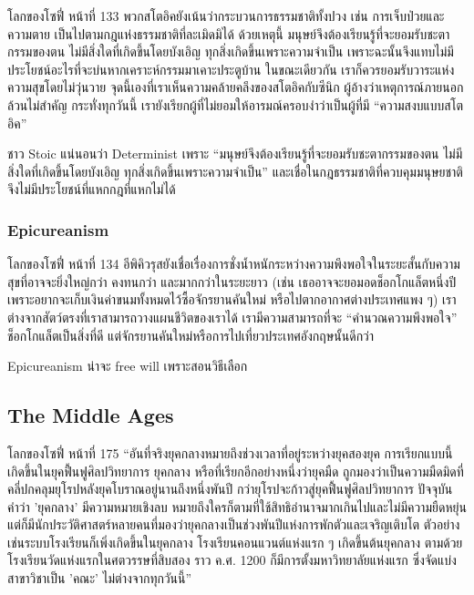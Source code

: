\begin{bookquote}{โลกของโซฟี่ หน้าที่ 133}
พวกสโตอิคยังเน้นว่ากระบวนการธรรมชาติทั้งปวง เช่น การเจ็บป่วยและความตาย เป็นไปตามกฎแห่งธรรมชาติที่ละเมิดมิได้ ด้วยเหตุนี้ มนุษย์จึงต้องเรียนรู้ที่จะยอมรับชะตากรรมของตน ไม่มีสิ่งใดที่เกิดขึ้นโดยบังเอิญ ทุกสิ่งเกิดขึ้นเพราะความจำเป็น เพราะฉะนั้นจึงแทบไม่มีประโยชน์อะไรที่จะบ่นหากเคราะห์กรรมมาเคาะประตูบ้าน ในขณะเดียวกัน เราก็ควรยอมรับวาระแห่งความสุขโดยไม่วุ่นวาย จุดนี้เองที่เราเห็นความคล้ายคลึงของสโตอิคกับซีนิก ผู้อ้างว่าเหตุการณ์ภายนอกล้วนไม่สำคัญ กระทั่งทุกวันนี้ เรายังเรียกผู้ที่ไม่ยอมให้อารมณ์ครอบงำว่าเป็นผู้ที่มี “ความสงบแบบสโตอิค”
\end{bookquote}

ชาว Stoic แน่นอนว่า Determinist เพราะ “มนุษย์จึงต้องเรียนรู้ที่จะยอมรับชะตากรรมของตน ไม่มีสิ่งใดที่เกิดขึ้นโดยบังเอิญ ทุกสิ่งเกิดขึ้นเพราะความจำเป็น” และเชื่อในกฎธรรมชาติที่ควบคุมมนุษยชาติ จึงไม่มีประโยชน์ที่แหกกฎที่แหกไม่ได้

\subsubsection{Epicureanism}

\begin{bookquote}{โลกของโซฟี่ หน้าที่ 134}
อีพิคิวรุสยังเชื่อเรื่องการชั่งน้ำหนักระหว่างความพึงพอใจในระยะสั้นกับความสุขที่อาจจะยิ่งใหญ่กว่า คงทนกว่า และมากกว่าในระยะยาว (เช่น เธออาจจะยอมอดช็อกโกแล็ตหนึ่งปี เพราะอยากจะเก็บเงินค่าขนมทั้งหมดไว้ซื้อจักรยานคันใหม่ หรือไปตากอากาศต่างประเทศแพง ๆ) เราต่างจากสัตว์ตรงที่เราสามารถวางแผนชีวิตของเราได้ เรามีความสามารถที่จะ “คำนวณความพึงพอใจ” ช็อกโกแล็ตเป็นสิ่งที่ดี แต่จักรยานคันใหม่หรือการไปเที่ยวประเทศอังกฤษนั้นดีกว่า
\end{bookquote}

Epicureanism น่าจะ free will เพราะสอนวิธีเลือก

\subsection{The Middle Ages}

\begin{bookquote}{โลกของโซฟี่ หน้าที่ 175}
“อันที่จริงยุคกลางหมายถึงช่วงเวลาที่อยู่ระหว่างยุคสองยุค การเรียกแบบนี้เกิดขึ้นในยุคฟื้นฟูศิลปวิทยาการ ยุคกลาง หรือที่เรียกอีกอย่างหนึ่งว่ายุคมืด ถูกมองว่าเป็นความมืดมิดที่คลี่ปกคลุมยุโรปหลังยุคโบราณอยู่นานถึงหนึ่งพันปี กว่ายุโรปจะก้าวสู่ยุคฟื้นฟูศิลปวิทยาการ ปัจจุบัน คำว่า 'ยุคกลาง' มีความหมายเชิงลบ หมายถึงใครก็ตามที่ใช้สิทธิอำนาจมากเกินไปและไม่มีความยืดหยุ่น แต่ก็มีนักประวัติศาสตร์หลายคนที่มองว่ายุคกลางเป็นช่วงพันปีแห่งการพักตัวและเจริญเติบโต ตัวอย่างเช่นระบบโรงเรียนก็เพิ่งเกิดขึ้นในยุคกลาง โรงเรียนคอนแวนต์แห่งแรก ๆ เกิดขึ้นต้นยุคกลาง ตามด้วยโรงเรียนวัดแห่งแรกในศตวรรษที่สิบสอง ราว ค.ศ. 1200 ก็มีการตั้งมหาวิทยาลัยแห่งแรก ซึ่งจัดแบ่งสาขาวิชาเป็น 'คณะ' ไม่ต่างจากทุกวันนี้”
\end{bookquote}

